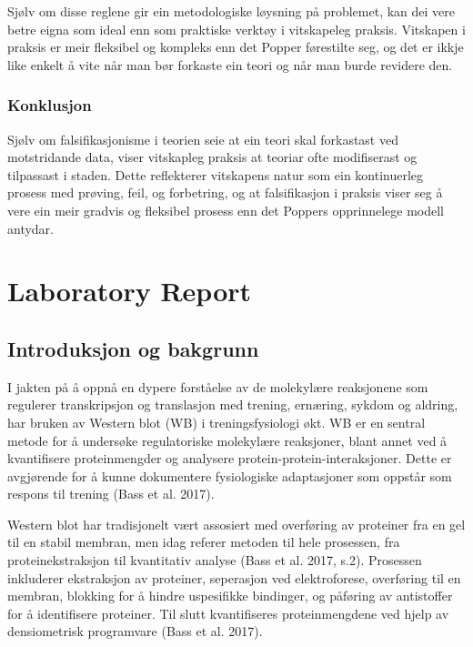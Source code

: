 \documentclass[
  letterpaper,
  DIV=11,
  numbers=noendperiod]{scrreprt}
\begin{document}
Sjølv om disse reglene gir ein metodologiske løysning på problemet, kan
dei vere betre eigna som ideal enn som praktiske verktøy i vitskapeleg
praksis. Vitskapen i praksis er meir fleksibel og kompleks enn det
Popper førestilte seg, og det er ikkje like enkelt å vite når man bør
forkaste ein teori og når man burde revidere den.

\subsection{Konklusjon}\label{konklusjon-2}

Sjølv om falsifikasjonisme i teorien seie at ein teori skal forkastast
ved motstridande data, viser vitskapleg praksis at teoriar ofte
modifiserast og tilpassast i staden. Dette reflekterer vitskapens natur
som ein kontinuerleg prosess med prøving, feil, og forbetring, og at
falsifikasjon i praksis viser seg å vere ein meir gradvis og fleksibel
prosess enn det Poppers opprinnelege modell antydar.


\chapter{Laboratory Report}\label{laboratory-report}

\section{Introduksjon og bakgrunn}\label{introduksjon-og-bakgrunn}

I jakten på å oppnå en dypere forståelse av de molekylære reaksjonene
som regulerer transkripsjon og translasjon med trening, ernæring, sykdom
og aldring, har bruken av Western blot (WB) i treningsfysiologi økt. WB
er en sentral metode for å undersøke regulatoriske molekylære
reaksjoner, blant annet ved å kvantifisere proteinmengder og analysere
protein-protein-interaksjoner. Dette er avgjørende for å kunne
dokumentere fysiologiske adaptasjoner som oppstår som respons til
trening (Bass et al. 2017).

Western blot har tradisjonelt vært assosiert med overføring av proteiner
fra en gel til en stabil membran, men idag referer metoden til hele
prosessen, fra proteinekstraksjon til kvantitativ analyse (Bass et al.
2017, s.2). Prosessen inkluderer ekstraksjon av proteiner, seperasjon
ved elektroforese, overføring til en membran, blokking for å hindre
uspesifikke bindinger, og påføring av antistoffer for å identifisere
proteiner. Til slutt kvantifiseres proteinmengdene ved hjelp av
densiometrisk programvare (Bass et al. 2017).
\end{document}
